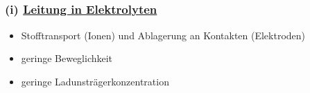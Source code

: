 \documentclass[11pt]{article}
\begin{document}
	\subsection{}
	\subsubsection*{(i) \underline{Leitung in Elektrolyten}}
	\begin{itemize}
		\item Stofftransport (Ionen) und Ablagerung an Kontakten (Elektroden)
		\item geringe Beweglichkeit
		\item geringe Ladunsträgerkonzentration
	\end{itemize}
\end{document}
